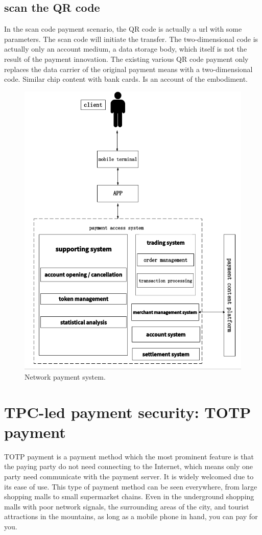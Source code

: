 \documentclass[journal]{IEEEtran}
\begin{document}
\subsection{scan the QR code}
In the scan code payment scenario, the QR code is actually a url with some parameters. The scan code will initiate the transfer. The two-dimensional code is actually only an account medium, a data storage body, which itself is not the result of the payment innovation. The existing various QR code payment only replaces the data carrier of the original payment means with a two-dimensional code. Similar chip content with bank cards. Is an account of the embodiment. 
\begin{figure}[htbp]
\centerline{\includegraphics[scale=0.42]{erweimazhifu.png}}
\caption{Network payment system.}
\label{fig}
\end{figure}


\section{TPC-led payment security: TOTP payment}
TOTP payment is a payment method which the most prominent feature is that the paying party do not need connecting to the Internet, which means only one party need communicate with the payment server. It is widely welcomed due to its ease of use. This type of payment method can be seen everywhere, from large shopping malls to small supermarket chains. Even in the underground shopping malls with poor network signals, the surrounding areas of the city, and tourist attractions in the mountains, as long as a mobile phone in hand, you can pay for you. 
\end{document}
